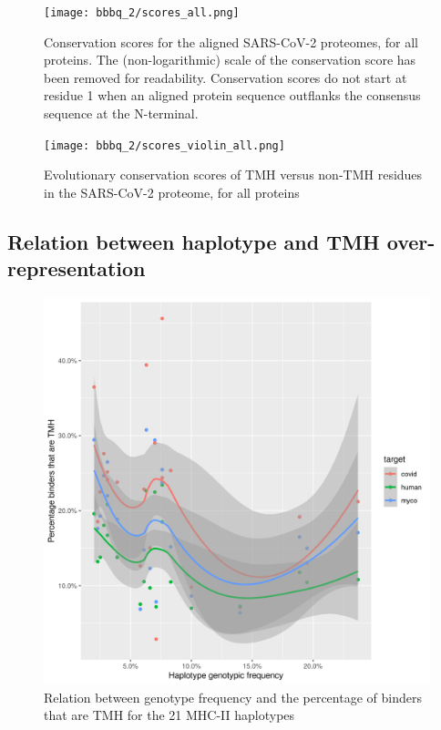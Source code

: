 \begin{figure}[!htbp]
  \texttt{[image: bbbq\_2/scores\_all.png]}
  \caption{
    Conservation scores for the aligned SARS-CoV-2 proteomes,
    for all proteins.
    The (non-logarithmic) scale of the conservation score has been removed
    for readability.
    Conservation scores do not start at residue 1 when
    an aligned protein sequence outflanks the consensus sequence 
    at the N-terminal.
  }
  \label{fig:evolutionary_conservation_all}
\end{figure}

\begin{figure}[!htbp]
  \texttt{[image: bbbq\_2/scores\_violin\_all.png]}
  \caption{
    Evolutionary conservation scores of TMH versus non-TMH
    residues in the SARS-CoV-2 proteome,
    for all proteins
  }
  \label{fig:evolutionary_conservation_all_violin}
\end{figure}

\subsection{Relation between haplotype and TMH over-representation}

\begin{figure}[!htbp]
  \includegraphics[width=\textwidth]{haplotype_freq_vs_f_tmh_epitopes/haplotype_perc_vs_f_tmh_binders.png}
  \caption{
    Relation between genotype frequency and the percentage
    of binders that are TMH for the 21 MHC-II haplotypes
  }
  \label{fig:haplotype_perc_vs_f_tmh_binders}
\end{figure}

